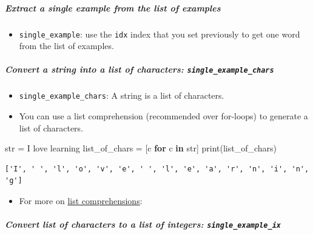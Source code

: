 \documentclass[11pt]{article}
\providecommand{\tightlist}{%
      \setlength{\itemsep}{0pt}\setlength{\parskip}{0pt}}
\newenvironment{Shaded}{}{}
\newcommand{\KeywordTok}[1]{\textcolor[rgb]{0.00,0.44,0.13}{\textbf{{#1}}}}
\newcommand{\StringTok}[1]{\textcolor[rgb]{0.25,0.44,0.63}{{#1}}}
\newcommand{\NormalTok}[1]{{#1}}
\newcommand{\ControlFlowTok}[1]{\textcolor[rgb]{0.00,0.44,0.13}{\textbf{{#1}}}}
\newcommand{\OperatorTok}[1]{\textcolor[rgb]{0.40,0.40,0.40}{{#1}}}
\newcommand{\BuiltInTok}[1]{{#1}}
\begin{document}
\hypertarget{extract-a-single-example-from-the-list-of-examples}{%
\subparagraph{Extract a single example from the list of
examples}\label{extract-a-single-example-from-the-list-of-examples}}

\begin{itemize}
\tightlist
\item
  \texttt{single\_example}: use the \texttt{idx} index that you set
  previously to get one word from the list of examples.
\end{itemize}

    \hypertarget{convert-a-string-into-a-list-of-characters-single_example_chars}{%
\subparagraph{\texorpdfstring{Convert a string into a list of
characters:
\texttt{single\_example\_chars}}{Convert a string into a list of characters: single\_example\_chars}}\label{convert-a-string-into-a-list-of-characters-single_example_chars}}

\begin{itemize}
\tightlist
\item
  \texttt{single\_example\_chars}: A string is a list of characters.
\item
  You can use a list comprehension (recommended over for-loops) to
  generate a list of characters.
\end{itemize}

\begin{Shaded}
\begin{Highlighting}[]
\BuiltInTok{str} \OperatorTok{=} \StringTok{\textquotesingle{}I love learning\textquotesingle{}}
\NormalTok{list\_of\_chars }\OperatorTok{=}\NormalTok{ [c }\ControlFlowTok{for}\NormalTok{ c }\KeywordTok{in} \BuiltInTok{str}\NormalTok{]}
\BuiltInTok{print}\NormalTok{(list\_of\_chars)}
\end{Highlighting}
\end{Shaded}

\begin{verbatim}
['I', ' ', 'l', 'o', 'v', 'e', ' ', 'l', 'e', 'a', 'r', 'n', 'i', 'n', 'g']
\end{verbatim}

\begin{itemize}
\tightlist
\item
  For more on
  \href{https://docs.python.org/3/tutorial/datastructures.html\#list-comprehensions}{list
  comprehensions}:
\end{itemize}

    \hypertarget{convert-list-of-characters-to-a-list-of-integers-single_example_ix}{%
\subparagraph{\texorpdfstring{Convert list of characters to a list of
integers:
\texttt{single\_example\_ix}}{Convert list of characters to a list of integers: single\_example\_ix}}\label{convert-list-of-characters-to-a-list-of-integers-single_example_ix}}
\end{document}

